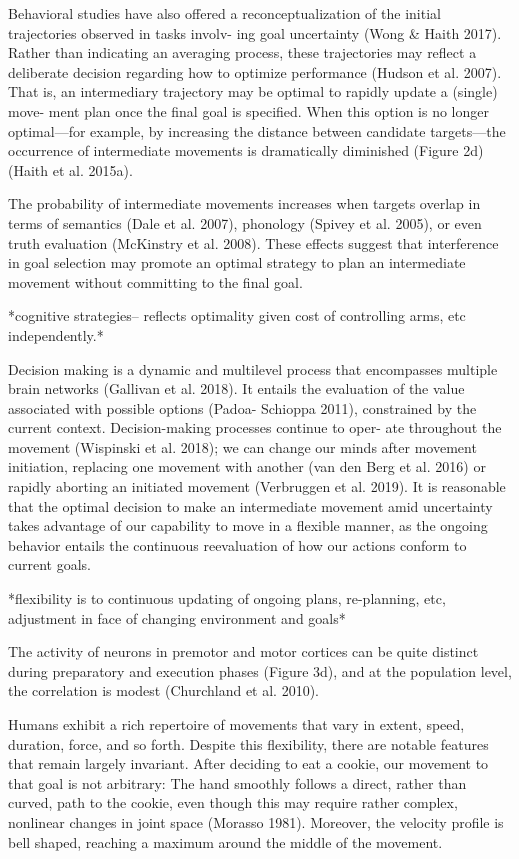 \documentclass[../main.tex]{subfiles}
\begin{document}
{{{Behavioral studies have also offered a reconceptualization of the initial trajectories observed in tasks involv- ing goal uncertainty (Wong & Haith 2017). Rather than indicating an averaging process, these trajectories may reflect a deliberate decision regarding how to optimize performance (Hudson et al. 2007). That is, an intermediary trajectory may be optimal to rapidly update a (single) move- ment plan once the final goal is specified. When this option is no longer optimal—for example, by increasing the distance between candidate targets—the occurrence of intermediate movements is dramatically diminished (Figure 2d) (Haith et al. 2015a).

The probability of intermediate movements increases when targets overlap in terms of semantics (Dale et al. 2007), phonology (Spivey et al. 2005), or even truth evaluation (McKinstry et al. 2008). These effects suggest that interference in goal selection may promote an optimal strategy to plan an intermediate movement without committing to the final goal. 

*cognitive strategies-- reflects optimality given cost of controlling arms, etc independently.*

Decision making is a dynamic and multilevel process that encompasses multiple brain networks (Gallivan et al. 2018). It entails the evaluation of the value associated with possible options (Padoa- Schioppa 2011), constrained by the current context. Decision-making processes continue to oper- ate throughout the movement (Wispinski et al. 2018); we can change our minds after movement initiation, replacing one movement with another (van den Berg et al. 2016) or rapidly aborting an initiated movement (Verbruggen et al. 2019). It is reasonable that the optimal decision to make an intermediate movement amid uncertainty takes advantage of our capability to move in a flexible manner, as the ongoing behavior entails the continuous reevaluation of how our actions conform to current goals.

*flexibility is to continuous updating of ongoing plans, re-planning, etc, adjustment in face of changing environment and goals* 

The activity of neurons in premotor and motor cortices can be quite distinct during preparatory and execution phases (Figure 3d), and at the population level, the correlation is modest (Churchland et al. 2010).

Humans exhibit a rich repertoire of movements that vary in extent, speed, duration, force, and so forth. Despite this flexibility, there are notable features that remain largely invariant. After deciding to eat a cookie, our movement to that goal is not arbitrary: The hand smoothly follows a direct, rather than curved, path to the cookie, even though this may require rather complex, nonlinear changes in joint space (Morasso 1981). Moreover, the velocity profile is bell shaped, reaching a maximum around the middle of the movement. 

}}}
\end{document}

